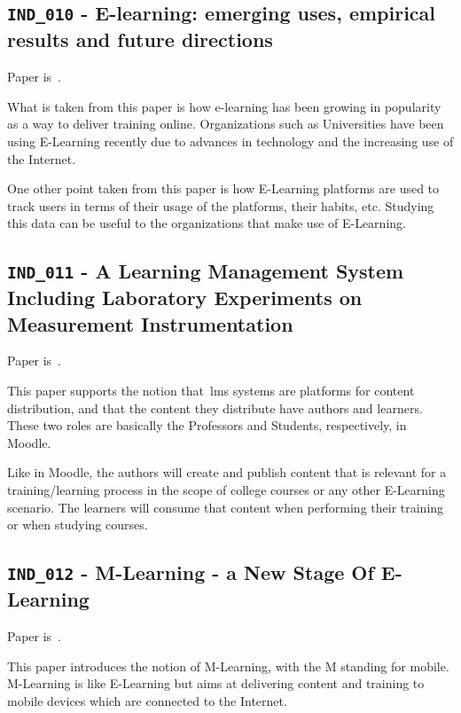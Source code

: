 \subsection{\texttt{IND\_010} - E-learning: emerging uses, empirical results
and future directions}

Paper is~\cite{ind_010}.

What is taken from this paper is how e-learning has been growing in popularity
as a way to deliver training online. Organizations such as Universities have
been using E-Learning recently due to advances in technology and the increasing
use of the Internet.

One other point taken from this paper is how E-Learning platforms are used to
track users in terms of their usage of the platforms, their habits, etc.
Studying this data can be useful to the organizations that make use of
E-Learning.

\subsection{\texttt{IND\_011} - A Learning Management System Including
Laboratory Experiments on Measurement Instrumentation}

Paper is~\cite{ind_011}.

This paper supports the notion that~\gls{lms} systems are platforms for content
distribution, and that the content they distribute have authors and learners.
These two roles are basically the Professors and Students, respectively, in
Moodle.

Like in Moodle, the authors will create and publish content that is relevant
for a training/learning process in the scope of college courses or any other
E-Learning scenario. The learners will consume that content when performing
their training or when studying courses.

\subsection{\texttt{IND\_012} - M-Learning - a New Stage Of E-Learning}

Paper is~\cite{ind_012}.

This paper introduces the notion of M-Learning, with the M standing for mobile.
M-Learning is like E-Learning but aims at delivering content and training to
mobile devices which are connected to the Internet.

